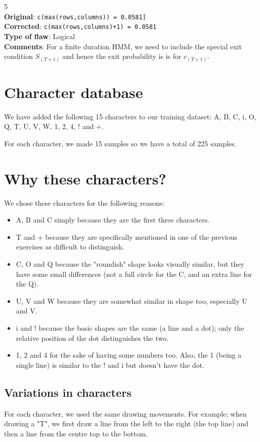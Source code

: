 \large{5}\\
\textbf{Original}: \texttt{c(max(rows,columns)) = 0.0581]}\\
\textbf{Corrected}: \texttt{c(max(rows,columns)+1) = 0.0581}\\
\textbf{Type of flaw}: Logical\\
\textbf{Comments}: For a finite duration HMM, we need to include the special exit condition $S_{(T+1)}$  and hence the exit probability is is for $c_{(T+1)}$.

\section{Character database}
We have added the following 15 characters to our training dataset: A, B, C, i, O, Q, T, U, V, W, 1, 2, 4, ! and +.

For each character, we made 15 samples so we have a total of 225 samples.

\section{Why these characters?}
We chose these characters for the following reasons:
\begin{itemize}
\item A, B and C simply because they are the first three characters.
\item T and + because they are specifically mentioned in one of the previous exercises as difficult to distinguish.
\item C, O and Q because the "roundish" shape looks visually similar, but they have some small differences (not a full circle for the C, and an extra line for the Q).
\item U, V and W because they are somewhat similar in shape too, especially U and V.
\item i and ! because the basic shapes are the same (a line and a dot); only the relative position of the dot distinguishes the two.
\item 1, 2 and 4 for the sake of having some numbers too. Also, the 1 (being a single line) is similar to the ! and i but doesn't have the dot.
\end{itemize}

\subsection{Variations in characters}
For each character, we used the same drawing movements. For example; when drawing a "T", we first draw a line from the left to the right (the top line) and then a line from the centre top to the bottom.

